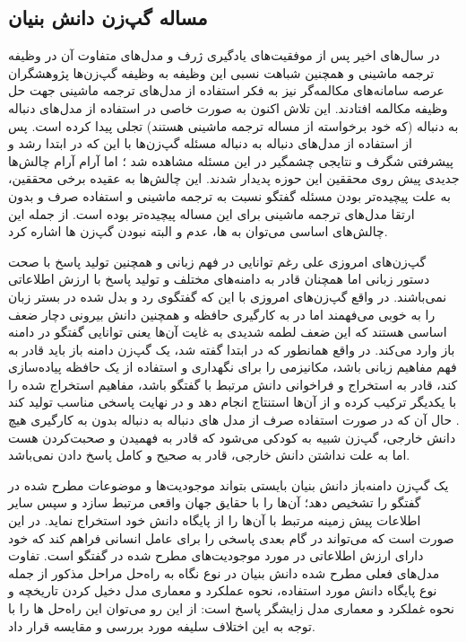 \subsection{مساله گپ‌زن دانش بنیان}\label{chap1:knowledge_problem}
در سال‌های اخیر پس از موفقیت‌های یادگیری ژرف  و مدل‌های متفاوت آن در وظیفه ترجمه ماشینی و همچنین شباهت نسبی این وظیفه به وظیفه گپ‌زن‌ها پژوهشگران عرصه سامانه‌های مکالمه‌گر نیز به فکر استفاده از مدل‌های ترجمه ماشینی جهت حل وظیفه مکالمه افتادند. این تلاش اکنون به صورت خاصی در استفاده از مدل‌های دنباله به دنباله (که خود برخواسته از مساله ترجمه ماشینی هستند) تجلی پیدا کرده است. پس از استفاده از مدل‌های دنباله به دنباله مسئله گپ‌زن‌ها با این که در ابتدا رشد و پیشرفتی شگرف و نتایجی چشمگیر در این مسئله مشاهده شد
\cite{a_neural_conv_model}
؛
اما آرام آرام چالش‌ها جدیدی پیش روی محققین این حوزه پدیدار شدند. این چالش‌ها به عقیده برخی محققین، به علت پیچیده‌تر بودن مسئله گفتگو نسبت به ترجمه ماشینی و استفاده صرف و بدون ارتقا مدل‌های ترجمه ماشینی برای این مساله پیچیده‌تر بوده است. از جمله این چالش‌های اساسی می‌توان به 
ها، عدم
 و البته 
نبودن گپ‌زن ها اشاره کرد.

گپ‌زن‌های امروزی علی رغم توانایی در فهم زبانی و همچنین تولید پاسخ با صحت دستور زبانی اما همچنان قادر به دامنه‌های مختلف و تولید پاسخ با ارزش اطلاعاتی نمی‌باشند. در واقع گپ‌زن‌های امروزی با این که گفتگوی رد و بدل شده در بستر زبان را به خوبی می‌فهمند اما در به کارگیری حافظه و همچنین دانش بیرونی دچار ضعف اساسی هستند که این ضعف لطمه شدیدی به غایت آن‌ها یعنی توانایی گفتگو در دامنه باز وارد می‌کند. در واقع همانطور که در ابتدا گفته شد، یک گپ‌زن دامنه باز باید قادر به فهم مفاهیم زبانی باشد، مکانیزمی را برای نگهداری و استفاده از یک حافظه پیاده‌سازی کند، قادر به استخراج و فراخوانی دانش مرتبط با گفتگو باشد، مفاهیم استخراج‌ شده را با یکدیگر ترکیب کرده و از آن‌ها استنتاج انجام دهد و در نهایت پاسخی مناسب تولید کند
\cite{wizard}
.
حال آن که در صورت استفاده صرف از مدل های دنباله به دنباله بدون به کارگیری هیچ دانش خارجی، گپ‌زن شبیه به کودکی می‌شود که قادر به فهمیدن و صحبت‌کردن هست اما به علت نداشتن دانش خارجی، قادر به صحیح و کامل پاسخ دادن نمی‌باشد.

یک گپ‌زن دامنه‌باز دانش بنیان بایستی بتواند موجودیت‌ها و موضوعات مطرح شده در گفتگو را تشخیص دهد؛ آن‌ها را با حقایق جهان واقعی مرتبط سازد و سپس سایر اطلاعات 
پیش زمینه مرتبط با آن‌ها را از پایگاه دانش خود استخراج نماید. 
در این صورت است که می‌تواند در گام بعدی پاسخی را برای عامل انسانی فراهم کند که خود دارای ارزش اطلاعاتی در مورد موجودیت‌های مطرح شده در گفتگو است. 
تفاوت مدل‌های فعلی مطرح شده دانش بنیان در نوع نگاه به راه‌حل مراحل مذکور 
از جمله نوع پایگاه دانش مورد استفاده، نحوه عملکرد و معماری مدل دخیل کردن تاریخچه و نحوه غملکرد و معماری مدل زایشگر پاسخ
است: از این رو می‌توان این راه‌حل ها را با توجه به این اختلاف سلیفه مورد بررسی و مقایسه قرار داد. 

